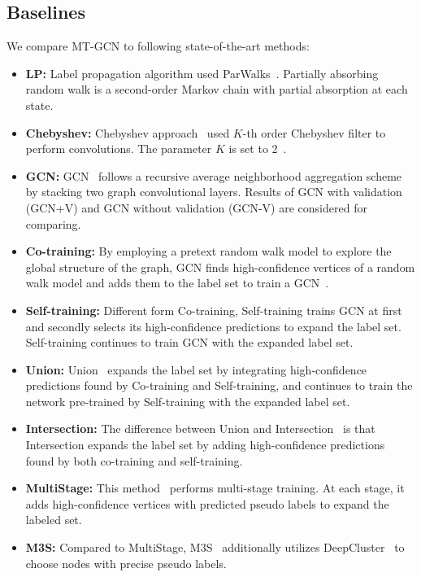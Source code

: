 \documentclass{article}
\begin{document}
\subsection{Baselines}
We compare MT-GCN to following state-of-the-art methods:
\begin{itemize}
  \item {\bf LP:} Label propagation algorithm used ParWalks~\cite{wu2012learning}. Partially absorbing random walk is a second-order Markov chain with partial absorption at each state.
  \item{\bf Chebyshev:} Chebyshev approach~\cite{defferrard2016convolutional} used $K$-th order Chebyshev filter to perform convolutions. The parameter $K$ is set to 2~\cite{kipf2016semi}.
  \item {\bf GCN:} GCN~\cite{kipf2016semi} follows a recursive average neighborhood aggregation scheme by stacking two graph convolutional layers. Results of GCN with validation (GCN+V) and GCN without validation (GCN-V) are considered for comparing.
  \item {\bf Co-training:} By employing a pretext random walk model to explore the global structure of the graph, GCN finds high-confidence vertices of a random walk model and adds them to the label set to train a GCN~\cite{li2018deeper}.
  \item {\bf Self-training:} Different form Co-training, Self-training trains GCN at first and secondly selects its high-confidence predictions to expand the label set. Self-training continues to train GCN with the expanded label set.
  \item {\bf Union:} Union~\cite{li2018deeper} expands the label set by integrating high-confidence predictions found by Co-training and Self-training, and continues to train the network pre-trained by Self-training with the expanded label set.
  \item {\bf Intersection:} The difference between Union and Intersection~\cite{li2018deeper} is that Intersection expands the label set by adding high-confidence predictions found by both co-training and self-training.
  \item {\bf MultiStage:} This method~\cite{sun2019multi} performs multi-stage training. At each stage, it adds high-confidence vertices with predicted pseudo labels to expand the labeled set.
  \item {\bf M3S:} Compared to MultiStage, M3S~\cite{sun2019multi} additionally utilizes DeepCluster~\cite{caron2018deep} to choose nodes with precise pseudo labels.
\end{itemize}
\end{document}
